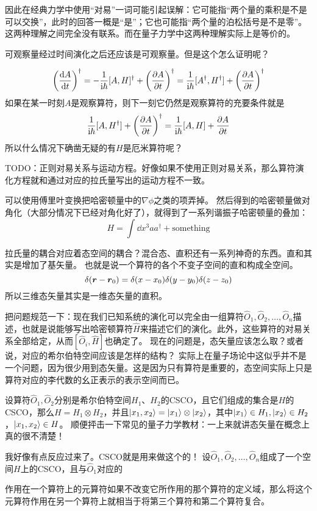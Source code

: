 \documentclass[UTF8, a4paper]{ctexart}
\newcommand*{\ii}{\mathrm{i}}
\begin{document}
因此在经典力学中使用“对易”一词可能引起误解：它可能指“两个量的乘积是不是可以交换”，此时的回答一概是“是”；它也可能指“两个量的泊松括号是不是零”。这两种理解之间完全没有联系。而在量子力学中这两种理解实际上是等价的。

可观察量经过时间演化之后还应该是可观察量。但是这个怎么证明呢？

\[
    \left(\dv{A}{t}\right)^\dagger = - \frac{1}{\ii \hbar} [A, H]^\dagger + \left(\pdv{A}{t}\right)^\dagger = \frac{1}{\ii \hbar} [A^\dagger, H^\dagger] + \left(\pdv{A}{t}\right)^\dagger
\]
如果在某一时刻$A$是观察算符，则下一刻它仍然是观察算符的充要条件就是
\[
    \frac{1}{\ii \hbar} [A, H^\dagger] + \left(\pdv{A}{t}\right)^\dagger = \frac{1}{\ii \hbar} [A, H] + \pdv{A}{t}
\]
所以什么情况下确凿无疑的有$H$是厄米算符呢？

TODO：正则对易关系与运动方程。好像如果不使用正则对易关系，那么算符演化方程就和通过对应的拉氏量写出的运动方程不一致。

可以使用傅里叶变换把哈密顿量中的$\nabla \phi$之类的项弄掉。
然后得到的哈密顿量做对角化（大部分情况下已经对角化好了），就得到了一系列谐振子哈密顿量的叠加：
\[
    H = \int \dd x^3 a a^\dagger + \text{something}
\]

拉氏量的耦合对应着态空间的耦合？混合态、直积还有一系列神奇的东西。直和其实是增加了基矢量。
也就是说一个算符的各个不变子空间的直和构成全空间。
\[
    \delta(\vb*{r} - \vb*{r}_0) = \delta(x - x_0) \delta(y - y_0) \delta(z - z_0)
\]
所以三维态矢量其实是一维态矢量的直积。

把问题规范一下：现在我们已知系统的演化可以完全由一组算符$\hat{O}_1, \hat{O}_2, \ldots, \hat{O}_n$描述，也就是说能够写出哈密顿算符$\hat{H}$来描述它们的演化。此外，这些算符的对易关系全部给定，从而$[\hat{O}_i, \hat{H}]$也确定了。
现在的问题是，态矢量应该怎么取？或者说，对应的希尔伯特空间应该是怎样的结构？
实际上在量子场论中这似乎并不是一个问题，因为很少用到态矢量。这是因为只有算符是重要的，态空间实际上只是算符对应的李代数的幺正表示的表示空间而已。

设算符$\hat{O}_1, \hat{O}_2$分别是希尔伯特空间$H_1$、$H_2$的CSCO，且它们组成的集合是$H$的CSCO，那么$H = H_1 \otimes H_2$，并且$\ket{x_1, x_2} = \ket{x_1} \otimes \ket{x_2}$，其中$\ket{x_1} \in H_1, \ket{x_2} \in H_2$，$\ket{x_1, x_2} \in H$。
顺便抨击一下常见的量子力学教材：一上来就讲态矢量在概念上真的很不清楚！

我好像有点反应过来了。CSCO就是用来做这个的！
设$\hat{O}_1, \hat{O}_2, \ldots, \hat{O}_n$组成了一个空间$H$上的CSCO，且与$\hat{O}_1$对应的

作用在一个算符上的元算符如果不改变它所作用的那个算符的定义域，那么将这个元算符作用在另一个算符上就相当于将第三个算符和第二个算符复合。
\end{document}
